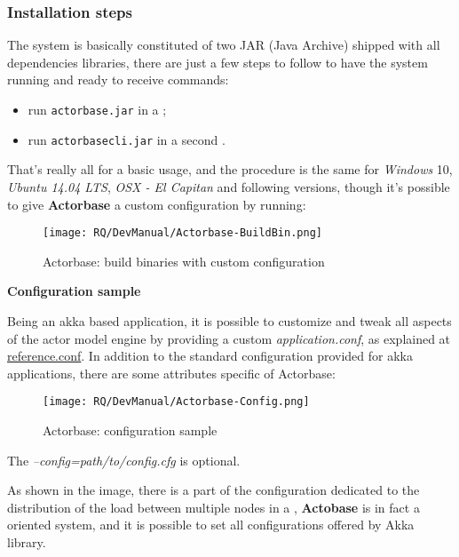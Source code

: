 \documentclass{scalatekids-article}
\begin{document}
\subsubsection{Installation steps}

The system is basically constituted of two JAR (Java Archive) shipped with all
dependencies libraries, there are just a few steps to follow to have the system
running and ready to receive commands:
\begin{itemize}
\item run \verb=actorbase.jar= in a ;
\item run \verb=actorbasecli.jar= in a second .
\end{itemize}
That's really all for a basic usage, and the procedure is the same for
\textit{Windows} 10, \textit{Ubuntu 14.04 LTS}, \textit{OSX - El
  Capitan} and following versions, though it's possible to give \textbf{Actorbase} a custom configuration by
running:

\begin{figure}[H]
  \begin{center}
    \texttt{[image: RQ/DevManual/Actorbase-BuildBin.png]}
    \caption{Actorbase: build binaries with custom configuration}
  \end{center}
\end{figure}

\textbf{Configuration sample}

Being an akka based application, it is possible to customize and tweak all
aspects of the actor model engine by providing a custom \textit{application.conf}, as
explained at
\href{http://doc.akka.io/docs/akka/2.4.7/general/configuration.html#Listing_of_the_Reference_Configuration}{reference.conf}.
In addition to the standard configuration provided for akka applications, there are some attributes specific
of Actorbase:

\begin{figure}[H]
  \begin{center}
    \texttt{[image: RQ/DevManual/Actorbase-Config.png]}
    \caption{Actorbase: configuration sample}
  \end{center}
\end{figure}

The \textit{--config=path/to/config.cfg} is optional.

As shown in the image, there is a part of the configuration dedicated to the
distribution of the load between multiple nodes in a , \textbf{Actobase} is in fact a
 oriented system, and it is possible to set all
 configurations offered by Akka library.
\end{document}
